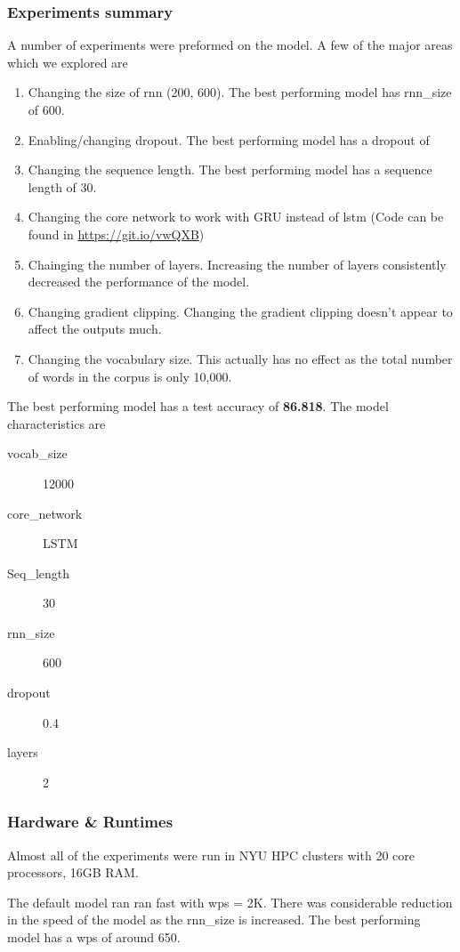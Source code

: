 \documentclass{article}
\begin{document}
\subsubsection{Experiments summary}
A number of experiments were preformed on the model.  A few of the major areas which we explored are
\begin{enumerate}
  \item Changing the size of rnn (200, 600).  The best performing model has rnn\_size of 600.
  \item Enabling/changing dropout.  The best performing model has a dropout of 
  \item Changing the sequence length.  The best performing model has a sequence length of 30.
  \item Changing the core network to work with GRU instead of lstm (Code can be found in \url{https://git.io/vwQXB})
  \item Chainging the number of layers.  Increasing the number of layers consistently decreased the performance of the model.
  \item Changing gradient clipping.  Changing the gradient clipping doesn't appear to affect the outputs much.
  \item Changing the vocabulary size.  This actually has no effect as the total number of words in the corpus is only 10,000.
\end{enumerate}

The best performing model has a test accuracy of \textbf{86.818}. The model characteristics are
\begin{description}
  \item[vocab\_size] 12000
  \item[core\_network] LSTM
  \item[Seq\_length] 30
  \item[rnn\_size] 600
  \item[dropout] 0.4
  \item[layers] 2
\end{description}


\subsubsection{Hardware \& Runtimes}
Almost all of the experiments were run in NYU HPC clusters with 20 core processors, 16GB RAM\@.

The default model ran ran fast with wps = 2K. There was considerable reduction in the speed of the model as the rnn\_size is increased. The best performing model has a wps of around 650.
\end{document}
